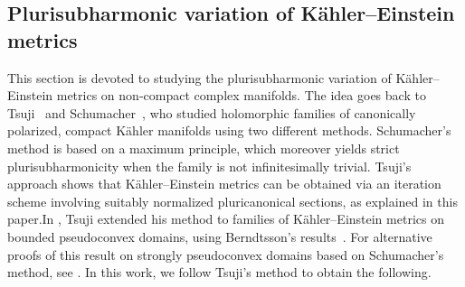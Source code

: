 \documentclass[a4paper, 11pt]{amsart}
\theoremstyle{plain}
\numberwithin{equation}{section} %
\numberwithin{figure}{section} %
\theoremstyle{plain}
\theoremstyle{plain}
\theoremstyle{plain}
\theoremstyle{plain}
\theoremstyle{remark}
\theoremstyle{definition}
\theoremstyle{definition}
\begin{document}
\subsection{Plurisubharmonic variation of K\"ahler--Einstein metrics} 
This section is devoted to studying the plurisubharmonic variation of K\"ahler--Einstein metrics on non‑compact complex manifolds. The idea goes back to Tsuji~\cite{Tsuji10-construction-KE} and Schumacher~\cite{Schumacher12-positivity-bundles}, who studied holomorphic families of canonically polarized, compact Kähler manifolds using two different methods. Schumacher’s method is based on a maximum principle, which moreover yields strict plurisubharmonicity when the family is not infinitesimally trivial. Tsuji’s approach shows that K\"ahler--Einstein metrics can be obtained via an iteration scheme involving suitably normalized pluricanonical sections, as explained in this paper.In \cite{Tsuji13-construction-KE-pseudoconvex}, Tsuji extended his method to families of K\"ahler--Einstein metrics on bounded pseudoconvex domains, using Berndtsson’s results~\cite{Berndtsson09-curvature-fibrations, Berndtsson06-subharmonicity-bergman}. For alternative proofs of this result on strongly pseudoconvex domains based on Schumacher’s method, see \cite{Choi15-variations-pseudoconvex, Choi15-study}. In this work, we follow Tsuji’s method to obtain the following.
\end{document}
